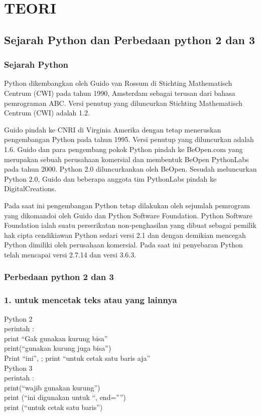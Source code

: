 \documentclass[12pt, times new roman, a4paper]{article}
\begin{document}
\section{TEORI}

\subsection{Sejarah Python dan Perbedaan python 2 dan 3}

\subsubsection{Sejarah Python}

Python dikembangkan oleh Guido van Rossum di Stichting Mathematisch Centrum (CWI) pada tahun 1990, Amsterdam sebagai terusan dari bahasa pemrograman ABC. Versi penutup yang diluncurkan Stichting Mathematisch Centrum (CWI) adalah 1.2.

Guido pindah ke CNRI di Virginia Amerika dengan tetap meneruskan pengembangan Python pada tahun 1995. Versi penutup yang diluncurkan adalah 1.6. Guido dan para pengembang pokok Python pindah ke BeOpen.com yang merupakan sebuah perusahaan komersial dan membentuk BeOpen PythonLabs pada tahun 2000. Python 2.0 diluncurkankan oleh BeOpen. Sesudah meluncurkan Python 2.0, Guido dan beberapa anggota tim PythonLabs pindah ke DigitalCreations.

Pada saat ini pengembangan Python tetap dilakukan oleh sejumlah pemrogram yang dikomandoi oleh Guido dan Python Software Foundation. Python Software Foundation ialah suatu perserikatan non-penghasilan yang dibuat sebagai pemilik hak cipta cendikiawan Python sedari versi 2.1 dan dengan demikian mencegah Python dimiliki oleh perusahaan komersial. Pada saat ini penyebaran Python telah mencapai versi 2.7.14 dan versi 3.6.3.\\

\subsubsection{Perbedaan python 2 dan 3}

\subsubsection*{1. untuk mencetak teks atau yang lainnya}
Python 2\\
perintah :\\
print “Gak gunakan kurung bisa”\\
print(“gunakan kurung juga bisa”)\\
Print “ini”, ; print “untuk cetak satu baris aja”\\
Python 3\\
perintah :\\
print(“wajib gunakan kurung”)\\
print (“ini digunakan untuk “, end=””)\\
print (“untuk cetak satu baris”)
\end{document}
